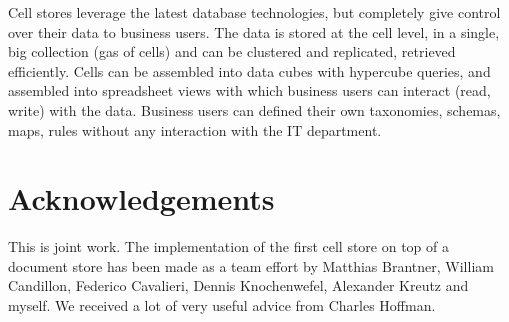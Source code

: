\documentclass{acm_proc_article-sp}
\begin{document}
Cell stores leverage the latest database technologies, but completely give control over their data to business users. The data is stored at the cell level, in a single, big collection (gas of cells) and can be clustered and replicated, retrieved efficiently. Cells can be assembled into data cubes with hypercube queries, and assembled into spreadsheet views with which business users can interact (read, write) with the data. Business users can defined their own taxonomies, schemas, maps, rules without any interaction with the IT department.

\section{Acknowledgements}

This is joint work. The implementation of the first cell store on top of a document store has been made as a team effort by Matthias Brantner, William Candillon, Federico Cavalieri, Dennis Knochenwefel, Alexander Kreutz and myself. We received a lot of very useful advice from Charles Hoffman.



\end{document}
